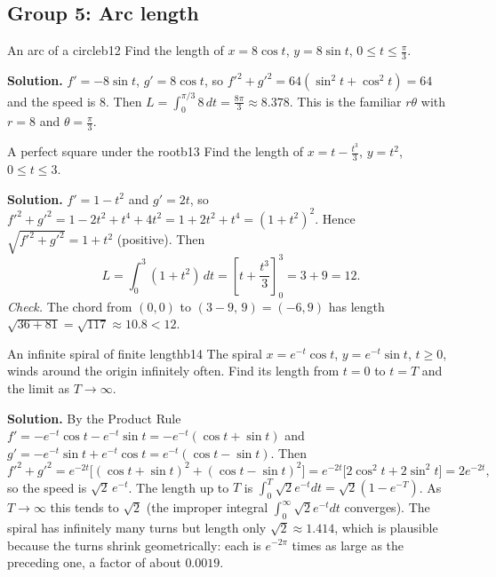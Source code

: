 \documentclass[11pt]{article}
\begin{document}
\subsection*{Group 5: Arc length}

\begin{exmp}{An arc of a circle}{b12}
Find the length of $x=8\cos t$, $y=8\sin t$, $0\le t\le\frac\pi3$.

\textbf{Solution.} $f'=-8\sin t$, $g'=8\cos t$, so $f'^2+g'^2=64\left(\sin^2t+\cos^2t\right)=64$ and the speed is $8$. Then $L=\int_0^{\pi/3}8\,dt=\frac{8\pi}3\approx8.378$. This is the familiar $r\theta$ with $r=8$ and $\theta=\frac\pi3$.
\end{exmp}

\begin{exmp}{A perfect square under the root}{b13}
Find the length of $x=t-\frac{t^3}3$, $y=t^2$, $0\le t\le3$.

\textbf{Solution.} $f'=1-t^2$ and $g'=2t$, so $f'^2+g'^2=1-2t^2+t^4+4t^2=1+2t^2+t^4=(1+t^2)^2$. Hence $\sqrt{f'^2+g'^2}=1+t^2$ (positive). Then
\[
L=\int_0^3(1+t^2)\,dt=\left[t+\frac{t^3}3\right]_0^3=3+9=12.
\]
\emph{Check.} The chord from $(0,0)$ to $(3-9,\,9)=(-6,9)$ has length $\sqrt{36+81}=\sqrt{117}\approx10.8<12$.
\end{exmp}

\begin{exmp}{An infinite spiral of finite length}{b14}
The spiral $x=e^{-t}\cos t$, $y=e^{-t}\sin t$, $t\ge0$, winds around the origin infinitely often. Find its length from $t=0$ to $t=T$ and the limit as $T\to\infty$.

\textbf{Solution.} By the Product Rule $f'=-e^{-t}\cos t-e^{-t}\sin t=-e^{-t}(\cos t+\sin t)$ and $g'=-e^{-t}\sin t+e^{-t}\cos t=e^{-t}(\cos t-\sin t)$. Then
\[
f'^2+g'^2=e^{-2t}\bigl[(\cos t+\sin t)^2+(\cos t-\sin t)^2\bigr]=e^{-2t}\bigl[2\cos^2t+2\sin^2t\bigr]=2e^{-2t},
\]
so the speed is $\sqrt2\,e^{-t}$. The length up to $T$ is $\int_0^T\sqrt2e^{-t}dt=\sqrt2\left(1-e^{-T}\right)$. As $T\to\infty$ this tends to $\sqrt2$ (the improper integral $\int_0^\infty\sqrt2e^{-t}dt$ converges). The spiral has infinitely many turns but length only $\sqrt2\approx1.414$, which is plausible because the turns shrink geometrically: each is $e^{-2\pi}$ times as large as the preceding one, a factor of about $0.0019$.
\end{exmp}
\end{document}
